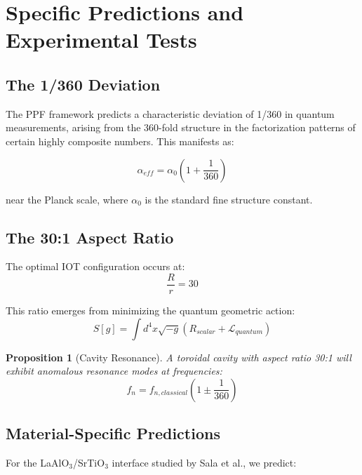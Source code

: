 \documentclass[conference]{IEEEtran}
\newtheorem{proposition}[theorem]{Proposition}
\begin{document}
\section{Specific Predictions and Experimental Tests}

\subsection{The 1/360 Deviation}

The PPF framework predicts a characteristic deviation of 1/360 in quantum measurements, arising from the 360-fold structure in the factorization patterns of certain highly composite numbers. This manifests as:

\begin{equation}
\alpha_{eff} = \alpha_0 \left(1 + \frac{1}{360}\right)
\end{equation}

near the Planck scale, where $\alpha_0$ is the standard fine structure constant.

\subsection{The 30:1 Aspect Ratio}

The optimal IOT configuration occurs at:
\begin{equation}
\frac{R}{r} = 30
\end{equation}

This ratio emerges from minimizing the quantum geometric action:
\begin{equation}
S[g] = \int d^4x \sqrt{-g} \left(R_{scalar} + \mathcal{L}_{quantum}\right)
\end{equation}

\begin{proposition}[Cavity Resonance]
A toroidal cavity with aspect ratio 30:1 will exhibit anomalous resonance modes at frequencies:
\begin{equation}
f_n = f_{n,classical} \left(1 \pm \frac{1}{360}\right)
\end{equation}
\end{proposition}

\subsection{Material-Specific Predictions}

For the LaAlO$_3$/SrTiO$_3$ interface studied by Sala et al., we predict:
\end{document}
